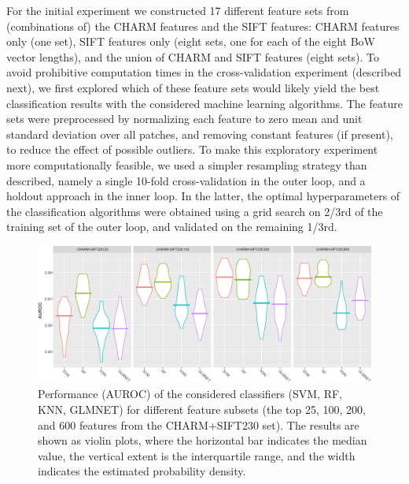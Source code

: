 For the initial experiment we constructed 17 different feature sets from (combinations of) the CHARM features and the SIFT features: CHARM features only (one set), SIFT features only (eight sets, one for each of the eight BoW vector lengths), and the union of CHARM and SIFT features (eight sets). To avoid prohibitive computation times in the cross-validation experiment (described next), we first explored which of these feature sets would likely yield the best classification results with the considered machine learning algorithms. The feature sets were preprocessed by normalizing each feature to zero mean and unit standard deviation over all patches, and removing constant features (if present), to reduce the effect of possible outliers. To make this exploratory experiment more computationally feasible, we used a simpler resampling strategy than described, namely a single 10-fold cross-validation in the outer loop, and a holdout approach in the inner loop. In the latter, the optimal hyperparameters of the classification algorithms were obtained using a grid search on 2/3rd of the training set of the outer loop, and validated on the remaining 1/3rd.

\begin{figure}
	\centering
	\includegraphics[width=\textwidth]{fig06}
	\caption{Performance (AUROC) of the considered classifiers (SVM, RF, KNN, GLMNET) for different feature subsets (the top 25, 100, 200, and 600 features from the CHARM+SIFT230 set). The results are shown as violin plots, where the horizontal bar indicates the median value, the vertical extent is the interquartile range, and the width indicates the estimated probability density.}
	\label{fig:subsetResults}
\end{figure}

